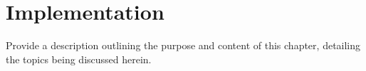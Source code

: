 \chapter{Implementation}
\label{chap:Implementation}
Provide a description outlining the purpose and content of this chapter, detailing the topics being discussed herein.







